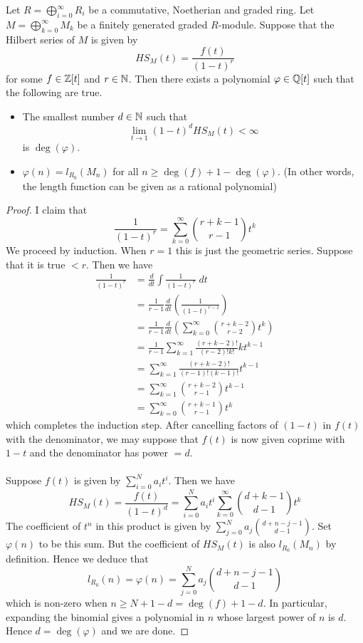 \documentclass[a4paper]{article}
\begin{document}
\begin{crl}{}{} Let $R=\bigoplus_{i=0}^\infty R_i$ be a commutative, Noetherian and graded ring. Let $M=\bigoplus_{k=0}^\infty M_k$ be a finitely generated graded $R$-module. Suppose that the Hilbert series of $M$ is given by $$HS_M(t)=\frac{f(t)}{(1-t)^r}$$ for some $f\in\mathbb{Z}[t]$ and $r\in\mathbb{N}$. Then there exists a polynomial $\varphi\in\mathbb{Q}[t]$ such that the following are true. 
\begin{itemize}
\item The smallest number $d\in\mathbb{N}$ such that $$\lim_{t\to 1}(1-t)^dHS_M(t)<\infty$$ is $\deg(\varphi)$. 
\item $\varphi(n)=l_{R_0}(M_n)$ for all $n\geq\deg(f)+1-\deg(\varphi)$. (In other words, the length function can be given as a rational polynomial)
\end{itemize} \tcbline
\begin{proof}
I claim that $$\frac{1}{(1-t)^r}=\sum_{k=0}^\infty\binom{r+k-1}{r-1}t^k$$ We proceed by induction. When $r=1$ this is just the geometric series. Suppose that it is true $<r$. Then we have 
\begin{align*}
\frac{1}{(1-t)^r}&=\frac{d}{dt}\int\frac{1}{(1-t)^r}\;dt\\
&=\frac{1}{r-1}\frac{d}{dt}\left(\frac{1}{(1-t)^{r-1}}\right)\\
&=\frac{1}{r-1}\frac{d}{dt}\left(\sum_{k=0}^\infty\binom{r+k-2}{r-2}t^k\right)\\
&=\frac{1}{r-1}\sum_{k=1}^\infty\frac{(r+k-2)!}{(r-2)!k!}kt^{k-1}\\
&=\sum_{k=1}^\infty\frac{(r+k-2)!}{(r-1)!(k-1)!}t^{k-1}\\
&=\sum_{k=1}^\infty\binom{r+k-2}{r-1}t^{k-1}\\
&=\sum_{k=0}^\infty\binom{r+k-1}{r-1}t^k
\end{align*}
which completes the induction step. After cancelling factors of $(1-t)$ in $f(t)$ with the denominator, we may suppose that $f(t)$ is now given coprime with $1-t$ and the denominator has power $=d$. \\~\\

Suppose $f(t)$ is given by $\sum_{i=0}^Na_it^i$. Then we have $$HS_M(t)=\frac{f(t)}{(1-t)^d}=\sum_{i=0}^Na_it^i\sum_{k=0}^\infty\binom{d+k-1}{d-1}t^k$$ The coefficient of $t^n$ in this product is given by $\sum_{j=0}^Na_j\binom{d+n-j-1}{d-1}$. Set $\varphi(n)$ to be this sum. But the coefficient of $HS_M(t)$ is also $l_{R_0}(M_n)$ by definition. Hence we deduce that $$l_{R_0}(n)=\varphi(n)=\sum_{j=0}^Na_j\binom{d+n-j-1}{d-1}$$ which is non-zero when $n\geq N+1-d=\deg(f)+1-d$. In particular, expanding the binomial gives a polynomial in $n$ whose largest power of $n$ is $d$. Hence $d=\deg(\varphi)$ and we are done. 
\end{proof}
\end{crl}
\end{document}
